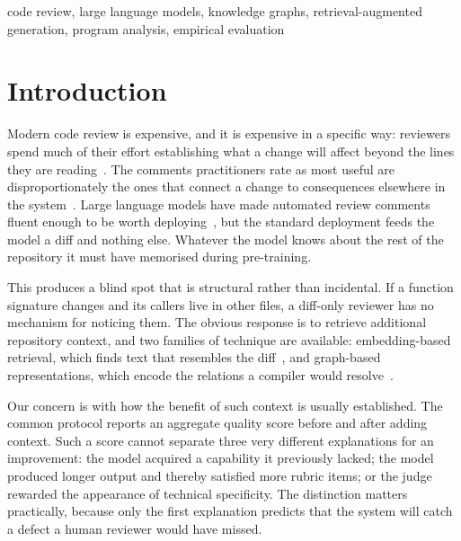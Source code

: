\documentclass[conference]{IEEEtran}
\begin{document}
\begin{IEEEkeywords}
code review, large language models, knowledge graphs,
retrieval-augmented generation, program analysis, empirical evaluation
\end{IEEEkeywords}

\section{Introduction} 
\label{sec:intro}

Modern code review is expensive, and it is expensive in a specific way:
reviewers spend much of their effort establishing what a change will affect
beyond the lines they are reading~\cite{bacchelli2013, sadowski2018}. The
comments practitioners rate as most useful are disproportionately the ones
that connect a change to consequences elsewhere in the
system~\cite{bosu2015}. Large language models have made automated review
comments fluent enough to be worth deploying~\cite{li2022codereviewer,
tufano2022codereview, fan2023llmse}, but the standard deployment feeds the
model a diff and nothing else. Whatever the model knows about the rest of the
repository it must have memorised during pre-training.

This produces a blind spot that is structural rather than incidental. If a
function signature changes and its callers live in other files, a diff-only
reviewer has no mechanism for noticing them. The obvious response is to
retrieve additional repository context, and two families of technique are
available: embedding-based retrieval, which finds text that resembles the
diff~\cite{lewis2020rag, zhang2023repocoder}, and graph-based
representations, which encode the relations a compiler would
resolve~\cite{allamanis2018programgraphs, guo2020graphcodebert,
liu2024graphcoder, yang2025kgcompass}.

Our concern is with how the benefit of such context is usually established.
The common protocol reports an aggregate quality score before and after
adding context. Such a score cannot separate three very different
explanations for an improvement: the model acquired a capability it
previously lacked; the model produced longer output and thereby satisfied
more rubric items; or the judge rewarded the appearance of technical
specificity. The distinction matters practically, because only the first
explanation predicts that the system will catch a defect a human reviewer
would have missed.
\end{document}

